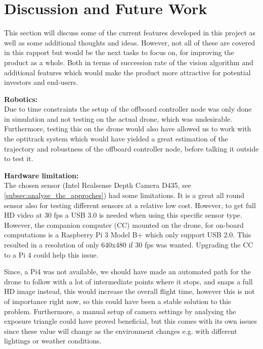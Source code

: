 \documentclass[../Head/Main.tex]{subfiles}
\begin{document}
\section{Discussion and Future Work}
\label{sec:discussion}

This section will discuss some of the current features developed in this project as well as some additional thoughts and ideas. However, not all of these are covered in this rapport but would be the next tasks to focus on, for improving the product as a whole. Both in terms of succession rate of the vision algorithm and additional features which would make the product more attractive for potential investors and end-users.

\par
\textbf{Robotics:}\\
Due to time constraints the setup of the offboard controller node was only done in simulation and not testing on the actual drone, which was undesirable. Furthermore, testing this on the drone would also have allowed us to work with the optitrack system which would have yielded a great estimation of the trajectory and robustness of the offboard controller node, before talking it outside to test it.

\par
\textbf{Hardware limitation:}\\
The chosen sensor (Intel Realsense Depth Camera D435, see \autoref{subsec:analyse_the_approches}) had some limitations. It is a great all round sensor also for testing different sensors at a relative low cost. However, to get full HD video at 30 fps a USB 3.0 is needed when using this specific sensor type. However, the companion computer (CC) mounted on the drone, for on-board computations is a Raspberry Pi 3 Model B+ which only support USB 2.0. This resulted in a resolution of only 640x480 if 30 fps was wanted.  Upgrading the CC to a Pi 4 could help this issue.  

\par
Since, a Pi4 was not available, we should have made an automated path for the drone to follow with a lot of intermediate points where it stops, and snaps a full HD image instead, this would increase the overall flight time, however this is not of importance right now, so this could have been a stable solution to this problem. Furthermore, a manual setup of camera settings by analysing the exposure triangle could have proved beneficial, but this comes with its own issues since these value will change as the environment changes e.g. with different lightings or weather conditions. 
\end{document}
